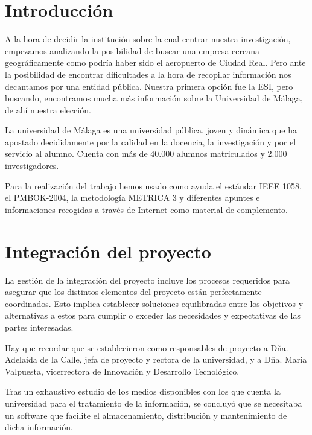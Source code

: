 \documentclass[11pt,a4paper,spanish,twoside]{report}
\begin{document}
\tableofcontents

\chapter*{Introducción}

A la hora de decidir la institución sobre la cual centrar nuestra 
investigación, empezamos analizando la posibilidad de buscar una empresa 
cercana geográficamente como podría haber sido el aeropuerto de Ciudad Real. 
Pero ante la posibilidad de encontrar dificultades a la hora de recopilar 
información nos decantamos por una entidad pública. Nuestra primera opción fue 
la ESI, pero buscando, encontramos mucha más información sobre la Universidad 
de Málaga, de ahí nuestra elección.

La universidad de Málaga es una universidad pública, joven y dinámica que ha 
apostado decididamente por la calidad en la docencia, la investigación y por el
servicio al alumno. Cuenta con más de 40.000 alumnos matriculados y 2.000 
investigadores. 

Para la realización del trabajo hemos usado como ayuda el estándar IEEE 1058, 
el PMBOK-2004, la metodología METRICA 3 y diferentes apuntes e informaciones 
recogidas a través de Internet como material de complemento.

\chapter{Integración del proyecto}
La gestión de la integración del proyecto incluye los procesos requeridos para 
asegurar que los distintos elementos del proyecto están perfectamente 
coordinados. Esto implica establecer soluciones equilibradas entre los 
objetivos y alternativas a estos para cumplir o exceder las necesidades  y 
expectativas de las partes interesadas.

Hay que recordar que se establecieron como responsables de proyecto a Dña. 
Adelaida de la Calle, jefa de proyecto y rectora de la universidad, y a Dña. 
María Valpuesta, vicerrectora de Innovación y Desarrollo Tecnológico.

Tras un exhaustivo estudio de los medios disponibles con los que cuenta la 
universidad para el tratamiento de la información, se concluyó que se 
necesitaba un software que facilite el almacenamiento, distribución y 
mantenimiento de dicha información.
\end{document}
